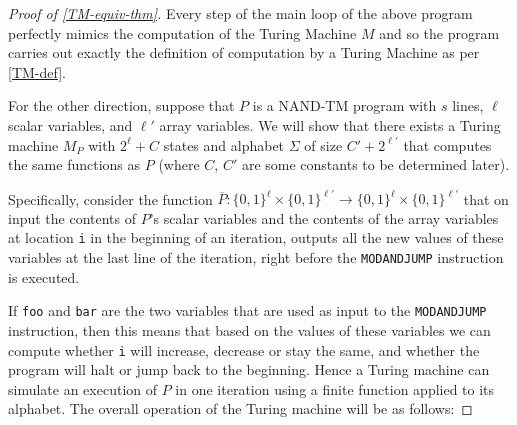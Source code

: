 \begin{proof}[Proof of \cref{TM-equiv-thm}]

Every step of the main loop of the above program perfectly mimics the
computation of the Turing Machine \(M\) and so the program carries out
exactly the definition of computation by a Turing Machine as per
\cref{TM-def}.

For the other direction, suppose that \(P\) is a NAND-TM program with
\(s\) lines, \(\ell\) scalar variables, and \(\ell'\) array variables.
We will show that there exists a Turing machine \(M_P\) with
\(2^\ell+C\) states and alphabet \(\Sigma\) of size \(C' + 2^{\ell'}\)
that computes the same functions as \(P\) (where \(C\), \(C'\) are some
constants to be determined later).

Specifically, consider the function
\(\overline{P}:\{0,1\}^\ell \times \{0,1\}^{\ell'} \rightarrow \{0,1\}^\ell \times \{0,1\}^{\ell'}\)
that on input the contents of \(P\)'s scalar variables and the contents
of the array variables at location \texttt{i} in the beginning of an
iteration, outputs all the new values of these variables at the last
line of the iteration, right before the \texttt{MODANDJUMP} instruction
is executed.

If \texttt{foo} and \texttt{bar} are the two variables that are used as
input to the \texttt{MODANDJUMP} instruction, then this means that based
on the values of these variables we can compute whether \texttt{i} will
increase, decrease or stay the same, and whether the program will halt
or jump back to the beginning. Hence a Turing machine can simulate an
execution of \(P\) in one iteration using a finite function applied to
its alphabet. The overall operation of the Turing machine will be as
follows:


\end{proof}
